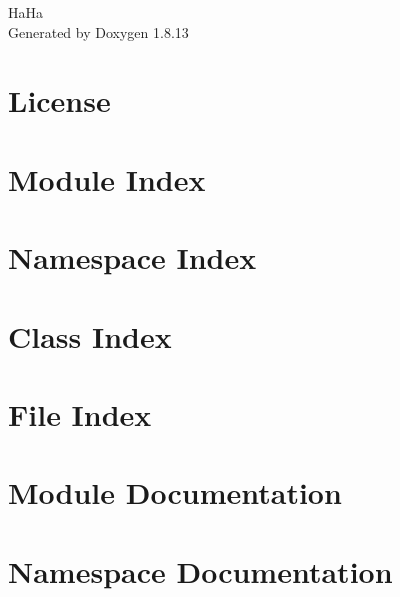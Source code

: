 \documentclass[twoside]{book}
\newcommand{\+}{\discretionary{\mbox{\scriptsize$\hookleftarrow$}}{}{}}
\newcommand{\clearemptydoublepage}{%
  \newpage{\pagestyle{empty}\cleardoublepage}%
}
\begin{document}
\hypersetup{pageanchor=false,
             bookmarksnumbered=true,
             pdfencoding=unicode
            }
\begin{titlepage}
\vspace*{7cm}
\begin{center}%
{\Large Ha\+Ha }\\
\vspace*{1cm}
{\large Generated by Doxygen 1.8.13}\\
\end{center}
\end{titlepage}
\clearemptydoublepage
{}
\tableofcontents
\clearemptydoublepage
{}
\hypersetup{pageanchor=true}

\chapter{License}
\label{_license}

\chapter{Module Index}

\chapter{Namespace Index}

\chapter{Class Index}

\chapter{File Index}

\chapter{Module Documentation}









\chapter{Namespace Documentation}

\end{document}
